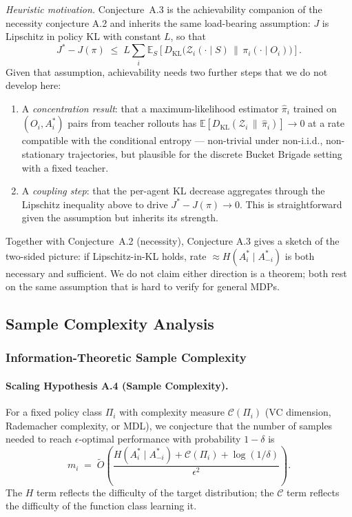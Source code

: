 \documentclass[10pt, letterpaper]{article}
\begin{document}
\emph{Heuristic motivation.} Conjecture~A.3 is the achievability companion of the necessity conjecture A.2 and inherits the same load-bearing assumption: $J$ is Lipschitz in policy KL with constant $L$, so that
\[J^* - J(\pi) \;\leq\; L \sum_i \mathbb{E}_S\!\left[ D_\text{KL}\bigl(\mathcal{Z}_i(\cdot \mid S) \,\|\, \pi_i(\cdot \mid O_i)\bigr) \right].\]
Given that assumption, achievability needs two further steps that we do not develop here:
\begin{enumerate}
    \item A \emph{concentration result}: that a maximum-likelihood estimator $\hat{\pi}_i$ trained on $(O_i, A_i^*)$ pairs from teacher rollouts has $\mathbb{E}[D_\text{KL}(\mathcal{Z}_i \,\|\, \hat{\pi}_i)] \to 0$ at a rate compatible with the conditional entropy --- non-trivial under non-i.i.d., non-stationary trajectories, but plausible for the discrete Bucket Brigade setting with a fixed teacher.
    \item A \emph{coupling step}: that the per-agent KL decrease aggregates through the Lipschitz inequality above to drive $J^* - J(\pi) \to 0$. This is straightforward given the assumption but inherits its strength.
\end{enumerate}
Together with Conjecture~A.2 (necessity), Conjecture A.3 gives a sketch of the two-sided picture: if Lipschitz-in-KL holds, rate $\approx H(A_i^* \mid A_{-i}^*)$ is both necessary and sufficient. We do not claim either direction is a theorem; both rest on the same assumption that is hard to verify for general MDPs.

\subsection{Sample Complexity Analysis}

\subsubsection{Information-Theoretic Sample Complexity}

\paragraph{Scaling Hypothesis A.4 (Sample Complexity).} For a fixed policy class $\Pi_i$ with complexity measure $\mathcal{C}(\Pi_i)$ (VC dimension, Rademacher complexity, or MDL), we conjecture that the number of samples needed to reach $\epsilon$-optimal performance with probability $1-\delta$ is
\[m_i \;=\; \tilde{O}\!\left(\frac{H(A_i^*\mid A_{-i}^*) + \mathcal{C}(\Pi_i) + \log(1/\delta)}{\epsilon^2}\right).\]
The $H$ term reflects the difficulty of the target distribution; the $\mathcal{C}$ term reflects the difficulty of the function class learning it.
\end{document}
